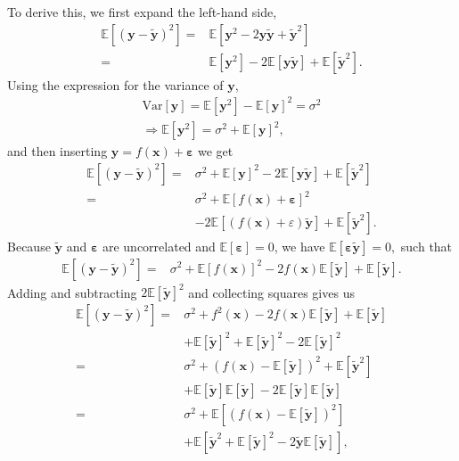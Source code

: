 \documentclass[a4paper, 10pt]{article}
\begin{document}
\begin{multicols}{2}
To derive this, we first expand the left-hand side,
\begin{align*}
\mathbb{E}[	(\bm{y}-\bm{\tilde{y}})^2] =& \mathbb{E}[\bm{y}^2  -2\bm{y}\bm{\tilde{y}}+ \bm { \tilde{y} } ^2 ] \\
=& \mathbb{E}[\bm{y}^2]  - 2\mathbb{E}[\bm{y\tilde{y}}]+\mathbb{E}[\bm{\tilde{y}}^2].
\end{align*}
Using the expression for the variance of $\bm{y}$,
\begin{align}
\text{Var}[\bm{y}] = \mathbb{E}[\bm{y}^2] - \mathbb{E}[{\bm{y}}]^2 = \sigma^2\\
\Rightarrow \mathbb{E}[\bm{y}^2] = \sigma^2 + \mathbb{E}[{\bm{y}}]^2,
\end{align}
 and then inserting $\bm{y} = f(\bm{x}) + \bm{\varepsilon}$ we get
\begin{align*}
\mathbb{E}[	(\bm{y}-\bm{\tilde{y}})^2]=& \sigma^2 +  \mathbb{E}[\bm{y}]^2  -2 \mathbb{E}[\bm{y}\bm{\tilde{y}}] +  \mathbb{E}[\bm{\tilde{y}}^2]\\
=& \sigma^2 +  \mathbb{E}[f(\bm{x}) + \bm{\varepsilon}]^2 \\&- 2 \mathbb{E} [(f(\bm{x})+\varepsilon)\bm{\tilde{y}}] +  \mathbb{E}[\bm{\tilde{y}}^2 ].
\end{align*}
Because  $\bm{\tilde{y}}$ and $\bm{\varepsilon}$ are uncorrelated and $\mathbb{E}[\bm{\varepsilon}]=0$, we have $\mathbb{E}[\bm{\varepsilon\tilde{y}}]=0,$ such that
\begin{align*}
\mathbb{E}[	(\bm{y}-\bm{\tilde{y}})^2]=& \sigma^2 +  \mathbb{E}[f(\bm{x})]^2 -2f(\bm{x}) \mathbb{E}[\bm{\tilde{y}}] +  \mathbb{E}[\bm{\tilde{y}}].
\end{align*}
Adding and subtracting $2\mathbb{E}[\bm{\tilde{y}}]^2$ and collecting squares gives us
\begin{align*}
\mathbb{E}[	(\bm{y}-\bm{\tilde{y}})^2]=&\sigma^2 + f^2(\bm{x})-2f(\bm{x}) \mathbb{E}[\bm{\tilde{y}}] +  \mathbb{E}[\bm{\tilde{y}}]\\&+\mathbb{E}[\bm{\tilde{y}}]^2 + \mathbb{E}[\bm{\tilde{y}}]^2 -2\mathbb{E}[\bm{\tilde{y}}]^2\\
=&  \sigma ^2  + ( f(\bm{x}) -\mathbb{E}[\bm{\tilde{y}}]  )^2 + \mathbb{E}[\bm{\tilde{y}}^2] \\&+\mathbb{E}[\bm{\tilde{y}}]\mathbb{E}[\bm{\tilde{y}}]  - 2\mathbb{E}[\bm{\tilde{y}}]\mathbb{E}[\bm{\tilde{y}}]\\
= &  \sigma^2 +\mathbb{E}[  ( f(\bm{x}) -\mathbb{E}[\bm{\tilde{y}}]  )^2]   \\&+ \mathbb{E}[\bm{\tilde{y}}^2 + \mathbb{E}[\bm{\tilde{y}}]^2 - 2\bm{\tilde{y}}\mathbb{E}[\bm{\tilde{y}}]],

\end{align*}
\end{multicols}
\end{document}
